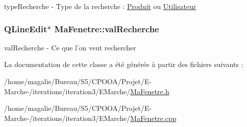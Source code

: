 type\-Recherche -\/ Type de la recherche \-: \hyperlink{class_produit}{Produit} ou \hyperlink{class_utilisateur}{Utilisateur} 

\hypertarget{class_ma_fenetre_a37836681a6d48a32dcd379b11447f579}{
\subsubsection[{val\-Recherche}]{\setlength{\rightskip}{0pt plus 5cm}Q\-Line\-Edit$\ast$ Ma\-Fenetre\-::val\-Recherche\hspace{0.3cm}{\ttfamily [protected]}}}\label{class_ma_fenetre_a37836681a6d48a32dcd379b11447f579}


val\-Recherche -\/ Ce que l'on veut rechercher 



La documentation de cette classe a été générée à partir des fichiers suivants \-:\begin{DoxyCompactItemize}
\item 
/home/magalie/\-Bureau/\-S5/\-C\-P\-O\-O\-A/\-Projet/\-E-\/\-Marche-\//iterations/iteration3/\-E\-Marche/\hyperlink{_ma_fenetre_8h}{Ma\-Fenetre.\-h}\item 
/home/magalie/\-Bureau/\-S5/\-C\-P\-O\-O\-A/\-Projet/\-E-\/\-Marche-\//iterations/iteration3/\-E\-Marche/\hyperlink{_ma_fenetre_8cpp}{Ma\-Fenetre.\-cpp}\end{DoxyCompactItemize}
